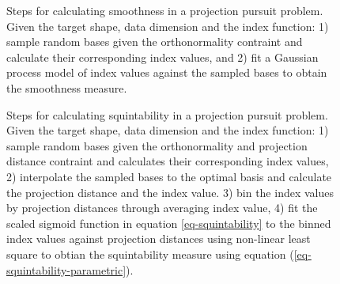 \documentclass[
  12pt,
]{interact}
\theoremstyle{plain}
\begin{document}
\begin{figure}


\caption{\label{fig-smoothness}Steps for calculating smoothness in a
projection pursuit problem. Given the target shape, data dimension and
the index function: 1) sample random bases given the orthonormality
contraint and calculate their corresponding index values, and 2) fit a
Gaussian process model of index values against the sampled bases to
obtain the smoothness measure.}

\end{figure}%

\begin{figure}


\caption{\label{fig-squintability}Steps for calculating squintability in
a projection pursuit problem. Given the target shape, data dimension and
the index function: 1) sample random bases given the orthonormality and
projection distance contraint and calculates their corresponding index
values, 2) interpolate the sampled bases to the optimal basis and
calculate the projection distance and the index value. 3) bin the index
values by projection distances through averaging index value, 4) fit the
scaled sigmoid function in equation \eqref{eq-squintability} to the
binned index values against projection distances using non-linear least
square to obtian the squintability measure using equation
(\ref{eq-squintability-parametric}).}

\end{figure}%
\end{document}
